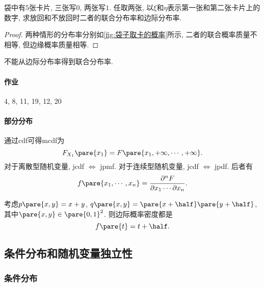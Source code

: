 \documentclass{ctexart}
\begin{document}
\begin{sample}
    \begin{ex}
        \label{ex:袋子取卡}
        袋中有$5$张卡片, 三张写$0$, 两张写$1$. 任取两张, 以$\xi$和$\eta$表示第一张和第二张卡片上的数字, 求放回和不放回时二者的联合分布率和边际分布率.
    \end{ex}
    \begin{proof}
        两种情形的分布率分别如\cref{fig:袋子取卡的概率}所示, 二者的联合概率质量不相等, 但边缘概率质量相等.
    \end{proof}
\end{sample}
\begin{remark}
    不能从边际分布率得到联合分布率.
\end{remark}

\paragraph{作业} %
\label{par:作业}

4, 8, 11, 19, 12, 20


\paragraph{部分分布} %
\label{par:部分分布}

通过cdf可得mcdf为
\[ F_{X_1}\pare{x_1} = F\pare{x_1,+\infty,\cdots,+\infty}. \]
对于离散型随机变量, jcdf $\Leftrightarrow$ jpmf. 对于连续型随机变量, jcdf $\Leftrightarrow$ jpdf. 后者有
\[ f\pare{x_1,\cdots, x_n} =  \frac{\partial^n F}{\partial x_1\cdots \partial x_n}. \]
\begin{sample}
    \begin{ex}
        考虑$p\pare{x,y} = x+y$, $q\pare{x,y} = \displaystyle\pare{x+\half}\pare{y+\half}$, 其中$\pare{x,y}\in \pare{0,1}^2$. 则边际概率密度都是
        \[ f\pare{t}  = t + \half. \]
    \end{ex}
\end{sample}



\subsection{条件分布和随机变量独立性} %
\label{sub:条件分布和随机变量独立性}

\subsubsection{条件分布} %
\label{ssub:条件分布}
\end{document}
